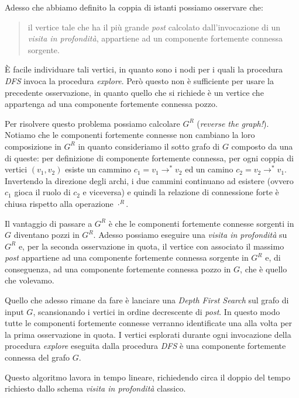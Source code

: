 Adesso che abbiamo definito la coppia di istanti possiamo osservare
che: 
\begin{quotation}
  il vertice tale che ha il pi\`u grande \emph{post} calcolato
  dall'invocazione di un \emph{visita in profondit\`a}, appartiene ad un
  componente fortemente connessa sorgente.
\end{quotation}

\`E facile individuare tali vertici, in quanto sono i nodi per i quali
la procedura \emph{DFS} invoca la procedura \emph{explore}. Per\`o
questo non \`e sufficiente per usare la precedente osservazione, in
quanto quello che si richiede \`e un vertice che appartenga ad una
componente fortemente connessa pozzo.

Per risolvere questo problema possiamo calcolare $G^{R}$
(\emph{reverse the graph!}). Notiamo che le componenti fortemente
connesse non cambiano la loro composizione in $G^{R}$ in quanto
consideriamo il sotto grafo di $G$ composto da una di queste: per
definizione di componente fortemente connessa, per ogni coppia di
vertici $(v_{1}, v_{2})$ esiste un cammino $c_{1} =
v_{1}\rightarrow^{*} v_{2}$ ed un camino $c_{2} = v_{2}\rightarrow^{*}
v_{1}$. Invertendo la direzione degli archi, i due cammini continuano
ad esistere (ovvero $c_{1}$ gioca il ruolo di $c_{2}$ e viceversa) e
quindi la relazione di connessione forte \`e chiusa rispetto alla
operazione $\cdot ^{R}$.

Il vantaggio di passare a $G^{R}$ \`e che le componenti fortemente
connesse sorgenti in $G$ diventano pozzi in $G^{R}$. Adesso possiamo
eseguire una \emph{visita in profondit\`a} su $G^{R}$ e, per la
seconda osservazione in quota, il vertice con associato il massimo
\emph{post} appartiene ad una componente fortemente connessa sorgente in
$G^{R}$ e, di conseguenza, ad una componente fortemente connessa pozzo
in $G$, che \`e quello che volevamo.

Quello che adesso rimane da fare \`e lanciare una \emph{Depth First
  Search} sul grafo di input $G$, scansionando i vertici in ordine
decrescente di \emph{post}. In questo modo tutte le componenti
fortemente connesse verranno identificate una alla volta per la prima
osservazione in quota. I vertici esplorati durante ogni invocazione
della procedura \emph{explore} eseguita dalla procedura \emph{DFS} \`e
una componente fortemente connessa del grafo $G$.

Questo algoritmo lavora in tempo lineare, richiedendo circa il doppio
del tempo richiesto dallo schema \emph{visita in profondit\`a} classico.

